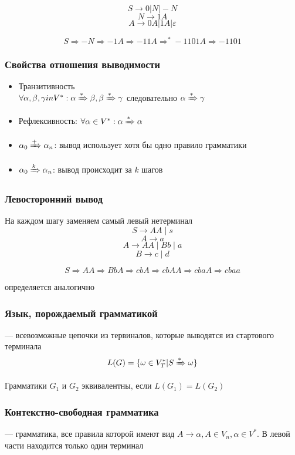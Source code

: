 \documentclass[a4paper, 14pt]{extarticle}
\begin{document}
\begin{example}
    \[ S \rightarrow 0 | N | -N \]
    \[ N \rightarrow 1A \]
    \[ A \rightarrow 0A | 1A | \varepsilon \]

    \[ S \Rightarrow -N \Rightarrow -1A \Rightarrow -11A \Rightarrow^* -1101A \Rightarrow -1101 \]
\end{example}

\subsubsection*{Свойства отношения выводимости}
\begin{itemize}
    \item Транзитивность\\
        $ \forall \alpha, \beta, \gamma in V^*: \alpha \xRightarrow{*} \beta, \beta \xRightarrow{*} \gamma $ следовательно $ \alpha \xRightarrow{*} \gamma$
    \item Рефлексивность: $ \forall \alpha \in V^*: \alpha \xRightarrow{*} \alpha $
    \item $\alpha_0 \xRightarrow{+} \alpha_n$: вывод использует хотя бы одно правило грамматики
    \item $ \alpha_0 \xRightarrow{k} \alpha_n $: вывод происходит за $k$ шагов
\end{itemize}

\subsubsection*{Левосторонний вывод}
На каждом шагу заменяем самый левый нетерминал
\[ S \rightarrow AA \mid s\]
\[A \rightarrow a\]
\[A \rightarrow AA \mid Bb \mid a\]
\[B \rightarrow c \mid d\]

\[ S \Rightarrow AA \Rightarrow BbA \Rightarrow cbA \Rightarrow cbAA \Rightarrow cbaA \Rightarrow cbaa \]

 определяется аналогично

\subsubsection*{Язык, порождаемый грамматикой} --- всевозможные цепочки из тервиналов, которые выводятся из стартового терминала
\[ L(G) = \{ \omega \in V_T^* | S \xRightarrow{*} \omega \} \]

Грамматики $G_1$ и $G_2$ эквивалентны, если $ L(G_1) = L(G_2) $ 

\subsubsection*{Контекстно-свободная грамматика} --- грамматика, все правила которой имеют вид $A \rightarrow \alpha, A \in V_n, \alpha \in V^*$. В левой части находится только один терминал
\end{document}
